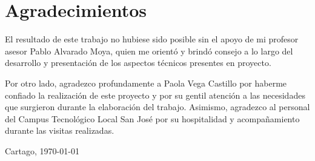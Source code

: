 \chapter*{Agradecimientos}
\thispagestyle{empty}

El resultado de este trabajo no hubiese sido posible sin el apoyo 
de mi profesor asesor Pablo Alvarado Moya, quien me orientó 
y brindó consejo a lo largo del desarrollo y presentación de los 
aspectos técnicos presentes en proyecto.

Por otro lado, agradezco  profundamente a Paola Vega Castillo por haberme confiado
la realización de este proyecto y por su gentil atención a las
necesidades que surgieron durante la elaboración del trabajo.
Asimismo, agradezco al personal del Campus Tecnológico Local San José
por su hospitalidad y acompañamiento durante las visitas realizadas.

\vspace*{1cm}

\thesisAuthor

Cartago, \today

\cleardoublepage

